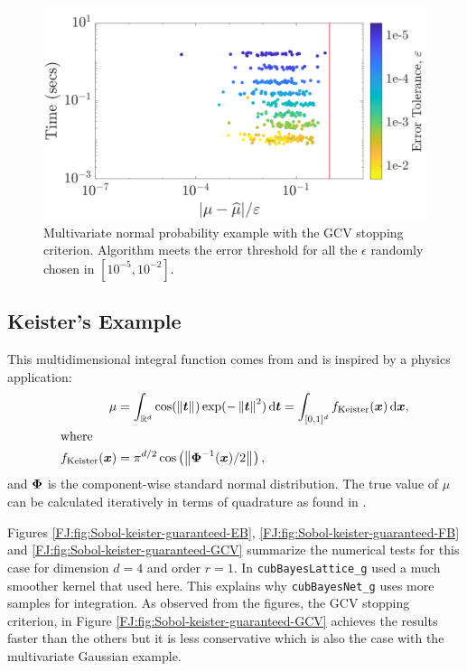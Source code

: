 \documentclass[graybox,footinfo]{svmult}
\newcommand{\norm}[2][{}]{\ensuremath{\left \lVert #2 \right \rVert}_{#1}}
\begin{document}
\begin{figure}
\centering
\includegraphics[width=0.95\linewidth]{"figures/Sobol/Sobol_MVN_guaranteed_time_GCV__d2_r1_2019-Sep-1"}
\caption[Sobol: MVN guaranteed: GCV]{Multivariate normal probability example with the GCV stopping criterion. Algorithm meets the error threshold for all the $\epsilon$ randomly chosen in $[10^{-5}, 10^{-2}]$.}
\label{FJ:fig:Sobol-mvn-guaranteed-GCV}
\end{figure}






\subsection{Keister's Example}

This multidimensional integral function comes from \cite{Kei96} and is inspired by a physics application:
\begin{align}
\label{FJ:eqn:keister_integral}
\mu  &=  \int_{\R^d} \cos(\norm{ \bst}) \exp(-\norm{ \bst }^2) \, \textup{d}\bst 
= \int_{[0,1]^d} f_{\textup{Keister}}(\bsx) \, \textup{d}\bsx,\\
\intertext{where }
\nonumber
f_\textup{Keister}(\bsx) &= \pi^{d/2} \cos\left(\norm{ \bsPhi^{-1}(\bsx)/2}\right)  ,
\end{align}
and ${\boldsymbol{\Phi}}$ is the component-wise standard normal distribution.
The true value of $\mu$ can be calculated iteratively in terms of  quadrature as found in \cite[Section 5.2]{RatHic19a}.


Figures \ref{FJ:fig:Sobol-keister-guaranteed-EB}, \ref{FJ:fig:Sobol-keister-guaranteed-FB} and \ref{FJ:fig:Sobol-keister-guaranteed-GCV} summarize the numerical tests for this case for dimension $d=4$ and order $r=1$.  
In \cite{RatHic19a} \texttt{cubBayesLattice\_g} used a much smoother kernel that used here.
This explains why \texttt{cubBayesNet\_g} uses more samples for integration.
As observed from the figures, the GCV stopping criterion, in Figure \ref{FJ:fig:Sobol-keister-guaranteed-GCV} achieves the results faster than the others but it is less conservative which is also the case with the multivariate Gaussian example.
\end{document}
